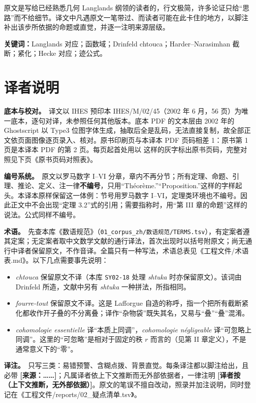 原文是写给已经熟悉几何 Langlands 纲领的读者的，行文极简，许多论证只给“思路”而不给细节。译文中凡遇原文一笔带过、而读者可能在此卡住的地方，以脚注补出该步所依据的命题或直觉，并逐一注明来源层级。

\medskip
\noindent\textbf{关键词：}Langlands 对应；函数域；Drinfeld chtouca；Harder--Narasimhan 截断；紧化；Hecke 对应；迹公式。

\section*{译者说明}

\textbf{底本与校对。}\ 译文以 IHES 预印本 IHES/M/02/45（2002 年 6 月，56 页）为唯一底本，逐句对译，未参照任何其他版本。底本 PDF 的文本层由 2002 年的 Ghostscript 以 Type3 位图字体生成，抽取后全是乱码，无法直接复制，故全部正文依页面图像逐页录入、核对。原书印刷页与本译本 PDF 页码相差 1：原书第 1 页是本译本 PDF 的第 2 页。每页起首处用以  这样的灰字标出原书页码，完整对照见下页《原书页码对照表》。

\textbf{编号系统。}\ 原文以罗马数字 I--VI 分章，章内不再分节；所有定理、命题、引理、推论、定义、注一律\textbf{不编号}，只用“Théorème.”“Proposition.”这样的字样起头。本译本原样保留这一体例：节号用罗马数字 I--VI，定理类环境也不编号。因此正文中不会出现“定理 3.2”式的引用；需要指称时，用“第 III 章的命题”这样的说法。公式同样不编号。

\textbf{术语。}\ 先查本库《数语规范》（\texttt{01\_corpus\_zh/数语规范/TERMS.tsv}），有定案者遵其定案；无定案者取中文数学文献的通行译法，首次出现时以括号附原文；尚无通行中译者保留原文，不作音译。全篇只有一种写法，术语总表见《工程文件/术语表.md》。以下几点需要事先说明：

\begin{itemize}
\item \emph{chtouca} 保留原文不译（本库 \texttt{SY02-18} 处理 \emph{shtuka} 时亦保留原文）。该词由 Drinfeld 所造，文献中另有 \emph{shtuka} 一种拼法，所指相同。
\item \emph{fourre-tout} 保留原文不译。这是 Lafforgue 自造的称呼，指一个把所有截断紧化都收作开子叠的不分离叠；译作“杂物袋”既失其名，又易与“叠”“叠”混淆。
\item \emph{cohomologie essentielle} 译“本质上同调”，\emph{cohomologie négligeable} 译“可忽略上同调”。这里的“可忽略”是相对于固定的秩 $r$ 而言的（见第 II 章定义），不是通常意义下的“零”。
\end{itemize}

\textbf{译注。}\ 只写三类：易错预警、含糊点拨、背景直觉。每条译注都以脚注给出，且必带 \textbf{[来源：……]}；凡属译者依上下文推断而无外部依据者，一律注明 \textbf{[译者按（上下文推断，无外部依据）]}。原文的笔误不擅自改动，照录并加注说明，同时登记在《工程文件/reports/02\_疑点清单.tsv》。

